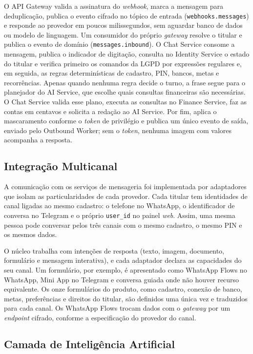O API Gateway valida a assinatura do \textit{webhook}, marca a mensagem para deduplicação, publica o evento cifrado no tópico de entrada (\texttt{webhooks.messages}) e responde ao provedor em poucos milissegundos, sem aguardar banco de dados ou modelo de linguagem. Um consumidor do próprio \textit{gateway} resolve o titular e publica o evento de domínio (\texttt{messages.inbound}). O Chat Service consome a mensagem, publica o indicador de digitação, consulta no Identity Service o estado do titular e verifica primeiro os comandos da LGPD por expressões regulares e, em seguida, as regras determinísticas de cadastro, PIN, bancos, metas e recorrências. Apenas quando nenhuma regra decide o turno, a frase segue para o planejador do AI Service, que escolhe quais consultas financeiras são necessárias. O Chat Service valida esse plano, executa as consultas no Finance Service, faz as contas em centavos e solicita a redação ao AI Service. Por fim, aplica o mascaramento conforme o \textit{token} de privilégio e publica um único evento de saída, enviado pelo Outbound Worker; sem o \textit{token}, nenhuma imagem com valores acompanha a resposta.

\subsection{Integração Multicanal}

A comunicação com os serviços de mensageria foi implementada por adaptadores que isolam as particularidades de cada provedor. Cada titular tem identidades de canal ligadas ao mesmo cadastro: o telefone no WhatsApp, o identificador de conversa no Telegram e o próprio \texttt{user\_id} no painel \textit{web}. Assim, uma mesma pessoa pode conversar pelos três canais com o mesmo cadastro, o mesmo PIN e os mesmos dados.

O núcleo trabalha com intenções de resposta (texto, imagem, documento, formulário e mensagem interativa), e cada adaptador declara as capacidades do seu canal. Um formulário, por exemplo, é apresentado como WhatsApp Flows no WhatsApp, Mini App no Telegram e conversa guiada onde não houver recurso equivalente. Os onze formulários do produto, como cadastro, conexão de banco, metas, preferências e direitos do titular, são definidos uma única vez e traduzidos para cada canal. Os WhatsApp Flows trocam dados com o \textit{gateway} por um \textit{endpoint} cifrado, conforme a especificação do provedor do canal.

\subsection{Camada de Inteligência Artificial}


